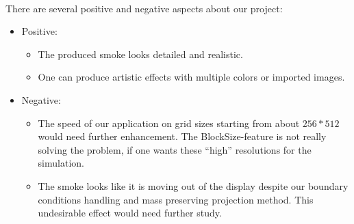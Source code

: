 \documentclass[a4paper,10pt,oneside,final,german,openbib,pdftex,titlepage]{scrbook}
\begin{document}
\begin{figure}[H]
{ \label{diffusionDemo}
}
\\
\end{figure}
%
There are several positive and negative aspects about our project:
\begin{itemize}
\item Positive:
\begin{itemize}
\item The produced smoke looks detailed and realistic.
\item One can produce artistic effects with multiple colors or imported images.
\end{itemize}
\item Negative:
\begin{itemize}
\item The speed of our application on grid sizes starting from about $256*512$ would need further enhancement. The BlockSize-feature is not really solving the problem, if one wants these ``high'' resolutions for the simulation.
\item The smoke looks like it is moving out of the display despite our boundary conditions handling and mass preserving projection method. This undesirable effect would need further study.
\end{itemize}
\end{itemize}
%
\end{document}
